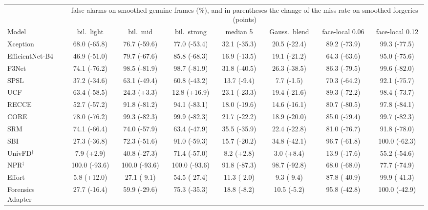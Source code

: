 \begin{tabular}{@{}l ccccccc@{}}
\toprule
 & \multicolumn{7}{c}{false alarms on smoothed genuine frames (\%), and in parentheses the change of the miss rate on smoothed forgeries (points)} \\
\cmidrule(lr){2-8}
Model & bil.\ light & bil.\ mid & bil.\ strong & median 5 & Gauss.\ blend & face-local 0.06 & face-local 0.12 \\
\midrule
Xception~\cite{xception} & 68.0 (-65.8) & 76.7 (-59.6) & 77.0 (-53.4) & 32.1 (-35.3) & 20.5 (-22.4) & 89.2 (-73.9) & 99.3 (-77.5) \\
EfficientNet-B4~\cite{efficientnet} & 46.9 (-51.0) & 79.7 (-67.6) & 85.8 (-68.3) & 16.9 (-13.5) & 19.1 (-21.2) & 64.3 (-63.6) & 95.0 (-75.6) \\
F3Net~\cite{f3net} & 74.1 (-76.2) & 98.5 (-81.9) & 98.7 (-81.9) & 31.8 (-40.5) & 26.3 (-38.5) & 86.3 (-79.5) & 99.6 (-82.0) \\
SPSL~\cite{spsl} & 37.2 (-34.6) & 63.1 (-49.4) & 60.8 (-43.2) & 13.7 (-9.4) & 7.7 (-1.5) & 70.3 (-64.2) & 92.1 (-75.7) \\
UCF~\cite{ucf} & 63.4 (-58.5) & 24.3 (+3.3) & 12.8 (+16.9) & 23.1 (-23.3) & 19.4 (-21.6) & 89.3 (-72.2) & 98.4 (-73.7) \\
RECCE~\cite{recce} & 52.7 (-57.2) & 91.8 (-81.2) & 94.1 (-83.1) & 18.0 (-19.6) & 14.6 (-16.1) & 80.7 (-80.5) & 97.8 (-84.1) \\
CORE~\cite{core} & 78.0 (-76.2) & 99.3 (-82.3) & 99.9 (-82.3) & 21.7 (-22.2) & 18.9 (-20.0) & 85.0 (-79.4) & 99.7 (-82.3) \\
SRM~\cite{srm} & 74.1 (-66.4) & 74.0 (-57.9) & 63.4 (-47.9) & 35.5 (-35.9) & 22.4 (-22.8) & 81.0 (-76.7) & 91.8 (-78.0) \\
SBI~\cite{sbi} & 27.3 (-36.8) & 72.3 (-51.6) & 91.0 (-59.3) & 15.7 (-20.2) & 34.8 (-42.1) & 96.7 (-61.8) & 100.0 (-62.3) \\
UnivFD$^\ddagger$~\cite{univfd} & 7.9 (+2.9) & 40.8 (-27.3) & 71.4 (-57.0) & 8.2 (+2.8) & 3.0 (+8.4) & 13.9 (-17.6) & 55.2 (-54.6) \\
NPR$^\ddagger$~\cite{npr} & 100.0 (-93.6) & 100.0 (-93.6) & 100.0 (-93.6) & 91.8 (-87.3) & 98.7 (-92.8) & 68.0 (-68.0) & 77.7 (-74.9) \\
Effort~\cite{effort} & 5.8 (+12.0) & 27.1 (-9.1) & 54.5 (-27.4) & 11.3 (-2.0) & 9.3 (-9.4) & 87.8 (-40.9) & 99.9 (-41.3) \\
Forensics Adapter~\cite{forensicsadapter} & 27.7 (-16.4) & 59.9 (-29.6) & 75.3 (-35.3) & 18.8 (-8.2) & 10.5 (-5.2) & 95.8 (-42.8) & 100.0 (-42.9) \\

\end{tabular}
